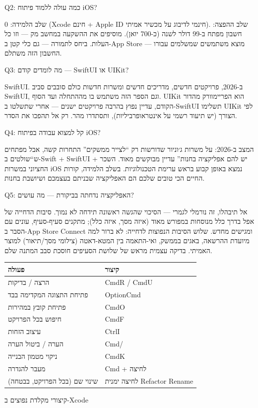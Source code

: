 Q2: כמה עולה ללמוד פיתוח iOS?

שלב הלמידה: 0 (Xcode חינם + Apple ID חינמי לדיבוג על מכשיר אמיתי). שלב ההפצה: חשבון מפתח ב-99 דולר לשנה (כ-700 יואן). מוסיפים את ההשקעה במחשב מק — וזו כל העלות. ביחס לתמורה — גם כלי קטן ב-App Store מוצא משתמשים שמשלמים עבורו — החשבון הזה משתלם.

Q3: מה לומדים קודם — SwiftUI או UIKit?

SwiftUI. ב-2026, פרויקטים חדשים, מדריכים חדשים ומשרות חדשות כולם סובבים סביב SwiftUI, וגם הספר הזה משתמש בו מההתחלה ועד הסוף. UIKit הוא הפריימוורק מהדור הקודם, עדיין נפוץ בהרבה פרויקטים ישנים — אחרי שתשלטו ב-SwiftUI תשלימו UIKit לפי הצורך (יש תיעוד רשמי על אינטראופרביליות), ותסתדרו מהר. רק אל תהפכו את הסדר.

Q4: קל למצוא עבודה בפיתוח iOS?

המצב ב-2026: על משרות ג׳וניור שדורשות רק “לצייר ממשקים” התחרות קשה, אבל מפתחים ש“שולטים ב-Swift + SwiftUI + יש להם אפליקציה בחנות” עדיין מבוקשים מאוד. השכר החציוני במשרות iOS נמצא באופן קבוע בראש ערימת הטכנולוגיות. בשלב הלמידה, קורות החיים הכי טובים שלכם הם האפליקציה שבניתם בעצמכם ושיושבת בחנות.

Q5: האפליקציה נדחתה בביקורת — מה עושים?

אל תיבהלו, זה נורמלי לגמרי — הסיכוי שהגשה ראשונה תידחה לא נמוך. סיבות הדחייה של אפל בדרך כלל מנוסחות במפורש מאוד (איזה מסך, איזה כלל); מתקנים סעיף-סעיף, עונים עם הסבר ב-App Store Connect ומגישים מחדש. שלוש הסיבות הנפוצות לדחייה: לא ברור למה מיועדת ההרשאה, באגים בממשק, ואי-התאמה בין המטא-דאטה (צילומי מסך/תיאור) למוצר האמיתי. בדיקה עצמית מראש של שלושת הסעיפים חוסכת סבב המתנה שלם.


\begin{center}
\begin{tabularx}{\linewidth}{|X|X|}
\hline
\textbf{פעולה} & \textbf{קיצור} \tabularnewline
\hline
הרצה / בדיקות & CmdR / CmdU \tabularnewline
פתיחת התצוגה המקדימה בבד & OptionCmd \tabularnewline
פתיחת קובץ במהירות & CmdO \tabularnewline
חיפוש בכל הפרויקט & CmdF \tabularnewline
עיצוב הזחות & CtrlI \tabularnewline
הערה / ביטול הערה & Cmd/ \tabularnewline
ניקוי מטמון הבנייה & CmdK \tabularnewline
מעבר להגדרה & Cmd + לחיצה \tabularnewline
שינוי שם (בכל הפרויקט, בבטחה) & לחיצה ימנית Refactor Rename \tabularnewline
\hline
\end{tabularx}
\end{center}

\begin{center}\small\color{gray}קיצורי מקלדת נפוצים ב-Xcode\end{center}

